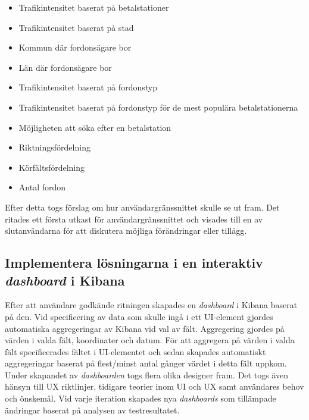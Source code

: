 \documentclass[12pt]{kththesis}
\begin{document}
\begin{itemize}
\item Trafikintensitet baserat på betalstationer
\item Trafikintensitet baserat på stad
\item Kommun där fordonsägare bor
\item Län där fordonsägare bor
\item Trafikintensitet baserat på fordonstyp 
\item Trafikintensitet baserat på fordonstyp för de mest populära betalstationerna
\item Möjligheten att söka efter en betalstation
\item Riktningsfördelning
\item Körfältsfördelning
\item Antal fordon
\end{itemize}

Efter detta togs förslag om hur användargränssnittet skulle se ut fram. Det ritades ett första utkast för användargränssnittet och visades till en av slutanvändarna för att diskutera möjliga förändringar eller tillägg. 

\subsection{ Implementera lösningarna i en interaktiv \textit{dashboard} i Kibana }
Efter att användare godkände ritningen skapades en \textit{dashboard} i Kibana baserat på den. Vid specificering av data som skulle ingå i ett UI-element gjordes automatiska aggregeringar av Kibana vid val av fält. Aggregering gjordes på värden i valda fält, koordinater och datum. För att aggregera på värden i valda fält specificerades fältet i UI-elementet och sedan skapades automatiskt aggregeringar baserat på flest/minst antal gånger värdet i detta fält uppkom. Under skapandet av \textit{dashboarden} togs flera olika designer fram. Det togs även hänsyn till UX riktlinjer, tidigare teorier inom UI och UX samt användares behov och önskemål. Vid varje iteration skapades nya \textit{dashboards} som tillämpade ändringar baserat på analysen av testresultatet.
\end{document}
